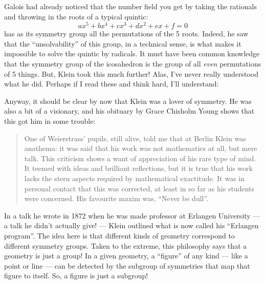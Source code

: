 \documentclass{article}
\renewcommand{\texttt}[1]{%
  \begingroup
  \ttfamily
  \begingroup\lccode`~=`/\lowercase{\endgroup\def~}{/\discretionary{}{}{}}%
  \begingroup\lccode`~=`[\lowercase{\endgroup\def~}{[\discretionary{}{}{}}%
  \begingroup\lccode`~=`.\lowercase{\endgroup\def~}{.\discretionary{}{}{}}%
  \catcode`/=\active\catcode`[=\active\catcode`.=\active
  \scantokens{#1\noexpand}%
  \endgroup
}
\begin{document}
Galois had already noticed that the number field you get by taking the
rationals and throwing in the roots of a typical quintic:
\[ax^5 + bx^4 + cx^3 + dx^2 + ex + f = 0\] has as its symmetry group all
the permutations of the 5 roots. Indeed, he saw that the
``unsolvability'' of this group, in a technical sense, is what makes it
impossible to solve the quintic by radicals. It must have been common
knowledge that the symmetry group of the icosahedron is the group of all
\emph{even} permutations of 5 things. But, Klein took this much further!
Alas, I've never really understood what he did. Perhaps if I read these
and think hard, I'll understand:


Anyway, it should be clear by now that Klein was a lover of symmetry. He
was also a bit of a visionary, and his obituary by Grace Chisholm Young
shows that this got him in some trouble:

\begin{quote}
One of Weierstrass' pupils, still alive, told me that at Berlin Klein
was anathema: it was said that his work was not mathematics at all, but
mere talk. This criticism shows a want of appreciation of his rare type
of mind. It teemed with ideas and brilliant reflections, but it is true
that his work lacks the stern aspects required by mathematical
exactitude. It was in personal contact that this was corrected, at least
in so far as his students were concerned. His favourite maxim was,
``Never be dull''.
\end{quote}

In a talk he wrote in 1872 when he was made professor at Erlangen
University --- a talk he didn't actually give! --- Klein outlined what
is now called his ``Erlangen program''. The idea here is that different
kinds of geometry correspond to different symmetry groups. Taken to the
extreme, this philosophy says that a geometry is just a group! In a
given geometry, a ``figure'' of any kind --- like a point or line ---
can be detected by the subgroup of symmetries that map that figure to
itself. So, a figure is just a subgroup!
\end{document}

